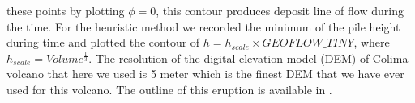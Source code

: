 \documentclass[letterpaper,10pt]{article}
\begin{document}
these points by plotting $\phi=0$, this contour produces deposit line of flow during the time. For the heuristic method we 
recorded the minimum of the pile height during time and plotted the contour of $ h = h_{scale} \times GEOFLOW \_ TINY$, where 
$ h_{scale} =Volume^\frac{1}{3} $.
The resolution of the digital elevation model (DEM) of Colima volcano that here we used is 5 meter which is the finest DEM 
that we have ever used for this volcano.
The outline of this eruption is available in \cite{NamikawaPhD}.
%                
\end{document}
